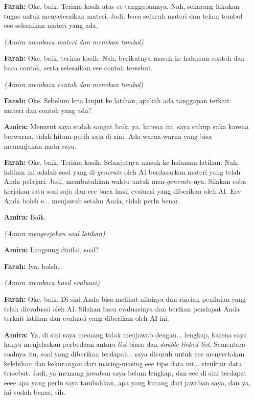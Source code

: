 \textbf{Farah:} Oke, baik. Terima kasih atas ee tanggapannya. Nah, sekarang lakukan tugas untuk menyelesaikan materi. Jadi, baca seluruh materi dan tekan tombol eee selesaikan materi yang ada.

\textit{(Amira membaca materi dan menekan tombol)}

\textbf{Farah:} Oke, baik, terima kasih. Nah, berikutnya masuk ke halaman contoh dan baca contoh, serta selesaikan eee contoh tersebut.

\textit{(Amira membaca contoh dan menekan tombol)}

\textbf{Farah:} Oke. Sebelum kita lanjut ke latihan, apakah ada tanggapan terkait materi dan contoh yang ada?

\textbf{Amira:} Menurut saya sudah sangat baik, ya, karena ini, saya cukup suka karena berwarna, tidak hitam-putih saja di sini. Ada warna-warna yang bisa memanjakan mata saya.

\textbf{Farah:} Oke, baik. Terima kasih. Selanjutnya masuk ke halaman latihan. Nah, latihan ini adalah soal yang di-\textit{generate} oleh AI berdasarkan materi yang telah Anda pelajari. Jadi, membutuhkan waktu untuk men-\textit{generate}-nya. Silakan coba kerjakan satu soal saja dan eee baca hasil evaluasi yang diberikan oleh AI. Eee Anda boleh e... menjawab setahu Anda, tidak perlu benar.

\textbf{Amira:} Baik.

\textit{(Amira mengerjakan soal latihan)}

\textbf{Amira:} Langsung dinilai, soal?

\textbf{Farah:} Iya, boleh.

\textit{(Amira membaca hasil evaluasi)}

\textbf{Farah:} Oke, baik. Di sini Anda bisa melihat nilainya dan rincian penilaian yang telah dievaluasi oleh AI. Silakan baca evaluasinya dan berikan pendapat Anda terkait latihan dan evaluasi yang diberikan oleh AI ini.

\textbf{Amira:} Ya, di sini saya memang tidak menjawab dengan... lengkap, karena saya hanya menjelaskan perbedaan antara \textit{list} biasa dan \textit{double linked list}. Sementara soalnya itu, soal yang diberikan terdapat... saya disuruh untuk eee menyertakan kelebihan dan kekurangan dari masing-masing eee tipe data ini... struktur data tersebut. Jadi, ya memang jawaban saya belum lengkap, dan eee di sini terdapat eeee apa yang perlu saya tambahkan, apa yang kurang dari jawaban saya, dan ya, ini sudah benar, sih.

